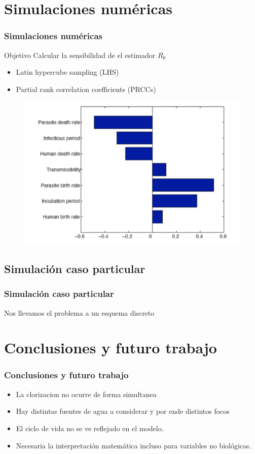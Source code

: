 \documentclass{beamer}
\begin{document}
\section{Simulaciones numéricas}
\begin{frame}
	\frametitle{Simulaciones numéricas}
	\begin{block}{Objetivo}
Calcular la sensibilidad de el estimador $R_0$
	\end{block}
	\begin{itemize}
		\item Latin hypercube sampling (LHS)
		\item Partial rank correlation
		coefficients (PRCCs)
	\end{itemize}
	\begin{figure}[resultados]
		\includegraphics[scale=0.4]{rangos.png}
		\label{rangos}
	\end{figure}
\end{frame}


\subsection{Simulación caso particular}
\begin{frame}
		\frametitle{Simulación caso particular}
		Nos llevamos el problema a un esquema discreto
\end{frame}

\section{Conclusiones y futuro trabajo}

\begin{frame}
	\frametitle{Conclusiones y futuro trabajo}


\begin{itemize}
	\item La clorizacion no ocurre de forma simultanea
	\item Hay distintas fuentes de agua a considerar y por ende distintos focos
	\item El ciclo de vida no se ve reflejado en el modelo.
	\item Necesaria la interpretación matemática incluso para variables no biológicas.
\end{itemize}
\end{frame}
\end{document}
